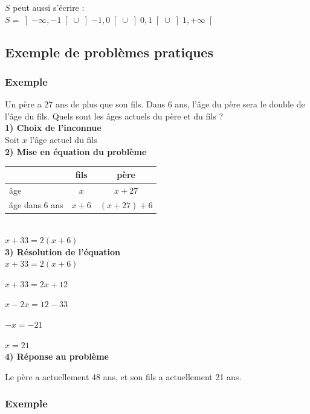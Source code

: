 $S$ peut aussi s'écrire : \\

$ S = \left]-\infty,-1\right[ \cup \left]-1,0\right[\cup\left]0,1\right[\cup\left]1,+\infty\right[$

\newpage

\subsection{Exemple de problèmes pratiques}

\subsubsection{Exemple }


Un père a 27 ans de plus que son fils. Dans 6 ans, l'âge du père sera le double de l'âge du fils. Quels sont les âges actuels du père et du fils ? \\

\textbf{1) Choix de l'inconnue } \\

Soit $x$ l'âge actuel du fils \\

\textbf{2) Mise en équation du problème} \\

\begin{tabular}{l|c|c|}
&fils&père \\
\hline
âge & $x$ & $ x+27 $ \\
\hline
âge dans 6 ans & $x+6$ & $ \left(x+27\right)+6$ \\
\hline
\end{tabular} \\


$ x+33 = 2\left(x+6\right) $ \\

\textbf{3) Résolution de l'équation} \\

$x+33 = 2\left(x+6\right)$

$x+33 = 2x+12 $

$x-2x = 12 - 33$

$ -x = -21 $

$ x = 21 $ \\

\textbf{4) Réponse au problème}

Le père a actuellement 48 ans, et son fils a actuellement 21 ans.

\newpage

\subsubsection{Exemple }



